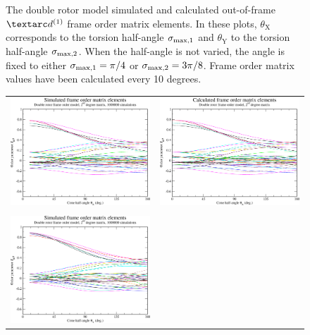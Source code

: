 \begin{figure}
\begin{tabular}{@{}cc@{}}
  \end{tabular}
  \caption[Double rotor simulated and calculated out-of-frame Daeg$^{(1)}$ elements.]{
    The double rotor model simulated and calculated out-of-frame $\FOone$ frame order matrix elements.
    In these plots, $\theta_\textrm{X}$ corresponds to the torsion half-angle $\sigma_{\textrm{max,1}}$ and $\theta_\textrm{Y}$ to the torsion half-angle $\sigma_{\textrm{max,2}}$.
    When the half-angle is not varied, the angle is fixed to either $\sigma_{\textrm{max,1}} = \pi/4$ or $\sigma_{\textrm{max,2}} = 3\pi/8$.
    Frame order matrix values have been calculated every 10 degrees.
  }
  \label{fig: simulated and calculated out-of-frame 1st degree double rotor frame order}
\end{figure}

\begin{figure}
\centering
  \begin{tabular}{@{}cc@{}}
    \includegraphics[width=.5\textwidth]{images/frame_order_matrix/Sijkl_double_rotor_out_of_frame_theta_x_ens1000000.eps} &
    \includegraphics[width=.5\textwidth]{images/frame_order_matrix/Sijkl_double_rotor_out_of_frame_theta_x_calc.eps} \\
    \\[-5pt]
    \includegraphics[width=.5\textwidth]{images/frame_order_matrix/Sijkl_double_rotor_out_of_frame_theta_y_ens1000000.eps} &

\end{tabular}
\end{figure}
